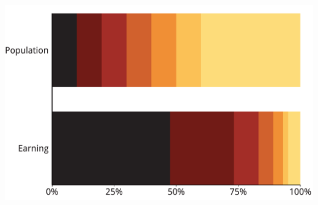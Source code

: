 \documentclass[tikz]{standalone}\usepackage[]{graphicx}\usepackage[]{color}
\newenvironment{knitrout}{}{} %
\begin{document}
\begin{knitrout}
\color{fgcolor}
\includegraphics[width=11.000in,height=7.00in]{./Super-tax-targeting/b5-super-atlas/Figure3-7-bar-1} 

\end{knitrout}
\end{document}
